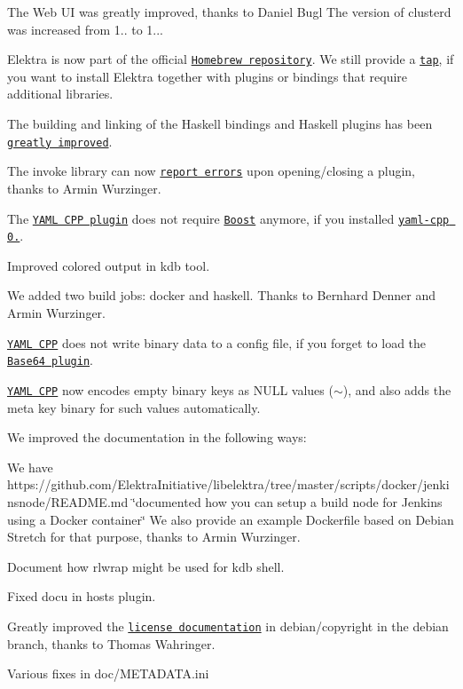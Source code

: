 \begin{DoxyItemize}
\item The Web UI was greatly improved, thanks to Daniel Bugl The version of clusterd was increased from 1.. to 1...
\item Elektra is now part of the official \href{http://formulae.brew.sh/formula/elektra}{\tt Homebrew repository}. We still provide a \href{http://github.com/ElektraInitiative/homebrew-elektra}{\tt tap}, if you want to install Elektra together with plugins or bindings that require additional libraries.
\item The building and linking of the Haskell bindings and Haskell plugins has been \href{https://github.com/ElektraInitiative/libelektra/pull/1698}{\tt greatly improved}.
\item The invoke library can now \href{https://github.com/ElektraInitiative/libelektra/pull/1801}{\tt report errors} upon opening/closing a plugin, thanks to Armin Wurzinger.
\item The \href{https://www.libelektra.org/plugins/yamlcpp}{\tt Y\+A\+ML C\+PP plugin} does not require \href{http://www.boost.org}{\tt Boost} anymore, if you installed \href{https://github.com/jbeder/yaml-cpp/releases/tag/yaml-cpp-0.6.0}{\tt yaml-\/cpp 0.}.
\item Improved colored output in {\ttfamily kdb} tool.
\item We added two build jobs\+: docker and haskell. Thanks to Bernhard Denner and Armin Wurzinger.
\item \href{https://www.libelektra.org/plugins/yamlcpp}{\tt Y\+A\+ML C\+PP} does not write binary data to a config file, if you forget to load the \href{https://www.libelektra.org/plugins/base64}{\tt Base64 plugin}.
\item \href{https://www.libelektra.org/plugins/yamlcpp}{\tt Y\+A\+ML C\+PP} now encodes empty binary keys as N\+U\+LL values ({\ttfamily $\sim$}), and also adds the meta key {\ttfamily binary} for such values automatically.
\end{DoxyItemize}

We improved the documentation in the following ways\+:


\begin{DoxyItemize}
\item We have https\+://github.com/\+Elektra\+Initiative/libelektra/tree/master/scripts/docker/jenkinsnode/\+R\+E\+A\+D\+M\+E.\+md \char`\"{}documented how you can setup a build node for Jenkins using a Docker container\char`\"{} We also provide an example Dockerfile based on Debian Stretch for that purpose, thanks to Armin Wurzinger.
\item Document how {\ttfamily rlwrap} might be used for {\ttfamily kdb shell}.
\item Fixed docu in {\ttfamily hosts} plugin.
\item Greatly improved the \href{https://git.libelektra.org/blob/debian/debian/copyright}{\tt license documentation} in {\ttfamily debian/copyright} in the {\ttfamily debian} branch, thanks to Thomas Wahringer.
\item Various fixes in doc/\+M\+E\+T\+A\+D\+A\+T\+A.\+ini
\end{DoxyItemize}

